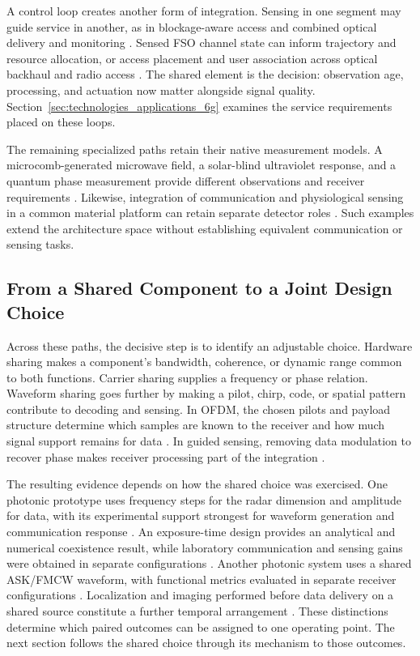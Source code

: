 A control loop creates another form of integration. Sensing in one segment may
guide service in another, as in blockage-aware access and combined optical
delivery and monitoring \cite{OISAC_SCR01011,OISAC_SCR00277}. Sensed FSO
channel state can inform trajectory and resource allocation, or access
placement and user association across optical backhaul and radio access
\cite{OISAC_SCR00917,OISAC_SCR00922}. The shared element is the decision:
observation age, processing, and actuation now matter alongside signal quality.
Section~\ref{sec:technologies_applications_6g} examines the service requirements placed on
these loops.

The remaining specialized paths retain their native measurement models. A
microcomb-generated microwave field, a solar-blind ultraviolet response, and a
quantum phase measurement provide different observations and receiver
requirements \cite{OISAC_SCR00268,OISAC_SCR00379,OISAC_SCR00906}. Likewise,
integration of communication and physiological sensing in a common material
platform can retain separate detector roles \cite{OISAC_SCR00001}. Such
examples extend the architecture space without establishing equivalent
communication or sensing tasks.

\subsection{From a Shared Component to a Joint Design Choice}

Across these paths, the decisive step is to identify an adjustable choice.
Hardware sharing makes a component's bandwidth, coherence, or dynamic range
common to both functions. Carrier sharing supplies a frequency or phase
relation. Waveform sharing goes further by making a pilot, chirp, code, or
spatial pattern contribute to decoding and sensing. In OFDM, the chosen pilots
and payload structure determine which samples are known to the receiver and
how much signal support remains for data \cite{OISAC_SCR00007}. In guided
sensing, removing data modulation to recover phase makes receiver processing
part of the integration \cite{OISAC_SCR00647}.

The resulting evidence depends on how the shared choice was exercised. One
photonic prototype uses frequency steps for the radar dimension and amplitude
for data, with its experimental support strongest for waveform generation and
communication response \cite{OISAC_SCR00160}. An exposure-time design provides
an analytical and numerical coexistence result, while laboratory communication
and sensing gains were obtained in separate configurations
\cite{OISAC_SCR00273}. Another photonic system uses a shared ASK/FMCW waveform,
with functional metrics evaluated in separate receiver configurations
\cite{OISAC_SCR00083}. Localization
and imaging performed before data delivery on a shared source constitute a
further temporal arrangement \cite{OISAC_SCR00012}. These distinctions
determine which paired outcomes can be assigned to one operating point. The
next section follows the shared choice through its mechanism to those
outcomes.
